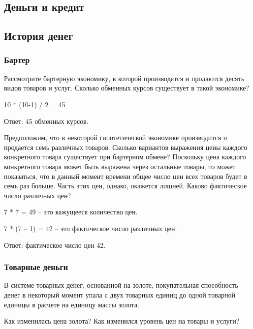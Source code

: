 \documentclass[12pt, table, a4paper,twoside]{exam}
\begin{document}
\vfill\null\cleardoublepage
\begin{questions}
\section{Деньги и кредит}
\subsection{История денег}
\subsubsection{Бартер}
\question[10] Рассмотрите бартерную экономику, в которой производятся и продаются десять видов товаров и услуг. Сколько обменных курсов существует в такой экономике?
\begin{solution}[12em]
	
	10 * (10-1) / 2 = 45
	
	Ответ: 45 обменных курсов.
\end{solution}

\question[10] Предположим, что в некоторой гипотетической экономике производится и продается семь различных товаров. Сколько вариантов выражения цены каждого конкретного товара существует при бартерном обмене? Поскольку цена каждого конкретного товара может быть выражена через остальные товары, то может показаться, что в данный момент времени общее число цен всех товаров будет в семь раз больше. Часть этих цен, однако, окажется лишней. Каково фактическое число различных цен?


\begin{solution}[12em]
	
	7 * 7 = 49 – это кажущееся количество цен.
	
	7 * (7 – 1)  = 42 – это фактическое число различных цен.
	
	Ответ: фактическое число цен 42.
	
\end{solution}

\subsubsection{Товарные деньги}
\question[10] В системе товарных денег, основанной на золоте, покупательная способность денег в некоторый момент упала с двух товарных единиц до одной товарной единицы в расчете на единицу массы золота. 

Как изменилась цена золота?
Как изменился уровень цен на товары и услуги?


\end{questions}
\end{document}

